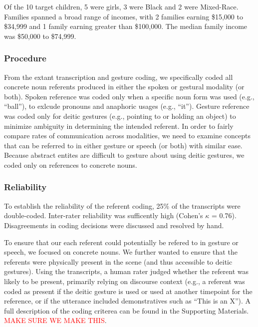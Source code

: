 \documentclass[english,,man,floatsintext]{apa6}
\begin{document}
Of the 10 target children, 5 were girls, 3 were Black and 2 were Mixed-Race. Families spanned a broad range of incomes, with 2 families earning \$15,000 to \$34,999 and 1 family earning greater than \$100,000. The median family income was \$50,000 to \$74,999.

\hypertarget{procedure}{%
\subsubsection{Procedure}\label{procedure}}

From the extant transcription and gesture coding, we specifically coded all concrete noun referents produced in either the spoken or gestural modality (or both). Spoken reference was coded only when a specific noun form was used (e.g., \enquote{ball}), to exlcude pronouns and anaphoric usages (e.g., \enquote{it}). Gesture reference was coded only for deitic gestures (e.g., pointing to or holding an object) to minimize ambiguity in determining the intended referent. In order to fairly compare rates of communication across modalities, we need to examine concepts that can be referred to in either gesture or speech (or both) with similar ease. Because abstract entites are difficult to gesture about using deitic gestures, we coded only on references to concrete nouns.

\hypertarget{reliability}{%
\subsubsection{Reliability}\label{reliability}}

To establish the reliability of the referent coding, 25\% of the transcripts were double-coded. Inter-rater reliability was sufficently high (Cohen's \(\kappa\) = 0.76). Disagreements in coding decisions were discussed and resolved by hand.

To ensure that our each referent could potentially be refered to in gesture or speech, we focused on concrete nouns. We further wanted to ensure that the referents were physically present in the scene (and thus accessible to deitic gestures). Using the transcripts, a human rater judged whether the referent was likely to be present, primarily relying on discourse context (e.g., a referent was coded as present if the deitic gesture is used or used at another timepoint for the reference, or if the utterance included demonstratives such as \enquote{This is an X}). A full description of the coding criterea can be found in the Supporting Materials. \textcolor{red}{MAKE SURE WE MAKE THIS}.
\end{document}
